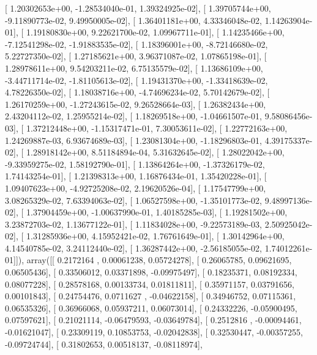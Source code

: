 \documentclass{article}
\begin{document}
       [  1.20302653e+00,  -1.28534040e-01,   1.39324925e-02],
       [  1.39705744e+00,  -9.11890773e-02,   9.49950005e-02],
       [  1.36401181e+00,   4.33346048e-02,   1.14263904e-01],
       [  1.19180830e+00,   9.22621700e-02,   1.09967711e-01],
       [  1.14235466e+00,  -7.12541298e-02,  -1.91883535e-02],
       [  1.18396001e+00,  -8.72146680e-02,   5.22727350e-02],
       [  1.27185621e+00,   3.96371087e-02,   1.07865198e-01],
       [  1.28978611e+00,   9.54203211e-02,   6.75135579e-02],
       [  1.13686109e+00,  -3.44711714e-02,  -1.81105613e-02],
       [  1.19431370e+00,  -1.33418639e-02,   4.78226350e-02],
       [  1.18038716e+00,  -4.74696234e-02,   5.70142679e-02],
       [  1.26170259e+00,  -1.27243615e-02,   9.26528664e-03],
       [  1.26382434e+00,   2.43204112e-02,   1.25955214e-02],
       [  1.18269518e+00,  -1.04661507e-01,   9.58086456e-03],
       [  1.37212448e+00,  -1.15317471e-01,   7.30053611e-02],
       [  1.22772163e+00,   1.24269887e-03,   6.93674689e-03],
       [  1.23081304e+00,  -1.18296803e-01,   4.39175337e-02],
       [  1.28918142e+00,   8.51184894e-04,   5.31632645e-02],
       [  1.28022042e+00,  -9.33959275e-02,   1.58192790e-01],
       [  1.13864264e+00,  -1.37326179e-02,   1.74143254e-01],
       [  1.21398313e+00,   1.16876434e-01,   1.35420228e-01],
       [  1.09407623e+00,  -4.92725208e-02,   2.19620526e-04],
       [  1.17547799e+00,   3.08265329e-02,   7.63394063e-02],
       [  1.06527598e+00,  -1.35101773e-02,   9.48997136e-02],
       [  1.37904459e+00,  -1.00637990e-01,   1.40185285e-03],
       [  1.19281502e+00,   3.23872703e-02,   1.13677122e-01],
       [  1.11834028e+00,  -9.22573189e-03,   2.50925042e-02],
       [  1.31285936e+00,   4.15952421e-02,   1.76761649e-01],
       [  1.30142964e+00,   4.14540785e-02,   3.24112440e-02],
       [  1.36287442e+00,  -2.56185055e-02,   1.74012261e-01]]), array([[ 0.2172164 ,  0.00061238,  0.05724278],
       [ 0.26065785,  0.09621695,  0.06505436],
       [ 0.33506012,  0.03371898, -0.09975497],
       [ 0.18235371,  0.08192334,  0.08077228],
       [ 0.28578168,  0.00133734,  0.01811811],
       [ 0.35971157,  0.03791656,  0.00101843],
       [ 0.24754476,  0.0711627 , -0.04622158],
       [ 0.34946752,  0.07115361,  0.06535326],
       [ 0.36966068,  0.05937211,  0.06073014],
       [ 0.24332226, -0.05900495,  0.07597621],
       [ 0.21021114, -0.06479593, -0.03649784],
       [ 0.2512816 , -0.00094461, -0.01621047],
       [ 0.23309119,  0.10853753, -0.02042838],
       [ 0.32530447, -0.00357255, -0.09724744],
       [ 0.31802653,  0.00518137, -0.08118974],
\end{document}

